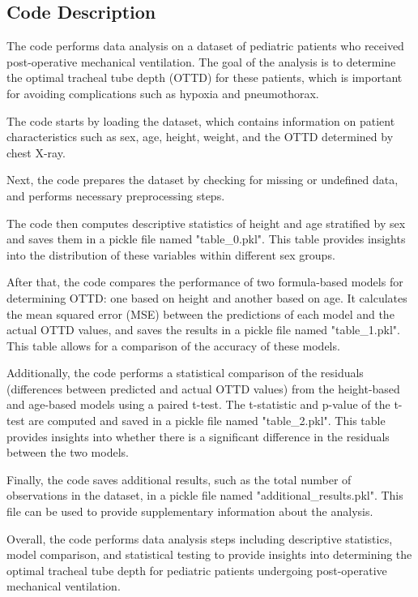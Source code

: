 \documentclass[11pt]{article}
\begin{document}
\subsection{Code Description}

The code performs data analysis on a dataset of pediatric patients who received post-operative mechanical ventilation. The goal of the analysis is to determine the optimal tracheal tube depth (OTTD) for these patients, which is important for avoiding complications such as hypoxia and pneumothorax.

The code starts by loading the dataset, which contains information on patient characteristics such as sex, age, height, weight, and the OTTD determined by chest X-ray. 

Next, the code prepares the dataset by checking for missing or undefined data, and performs necessary preprocessing steps.

The code then computes descriptive statistics of height and age stratified by sex and saves them in a pickle file named "table\_0.pkl". This table provides insights into the distribution of these variables within different sex groups.

After that, the code compares the performance of two formula-based models for determining OTTD: one based on height and another based on age. It calculates the mean squared error (MSE) between the predictions of each model and the actual OTTD values, and saves the results in a pickle file named "table\_1.pkl". This table allows for a comparison of the accuracy of these models.

Additionally, the code performs a statistical comparison of the residuals (differences between predicted and actual OTTD values) from the height-based and age-based models using a paired t-test. The t-statistic and p-value of the t-test are computed and saved in a pickle file named "table\_2.pkl". This table provides insights into whether there is a significant difference in the residuals between the two models.

Finally, the code saves additional results, such as the total number of observations in the dataset, in a pickle file named "additional\_results.pkl". This file can be used to provide supplementary information about the analysis.

Overall, the code performs data analysis steps including descriptive statistics, model comparison, and statistical testing to provide insights into determining the optimal tracheal tube depth for pediatric patients undergoing post-operative mechanical ventilation.
\end{document}
